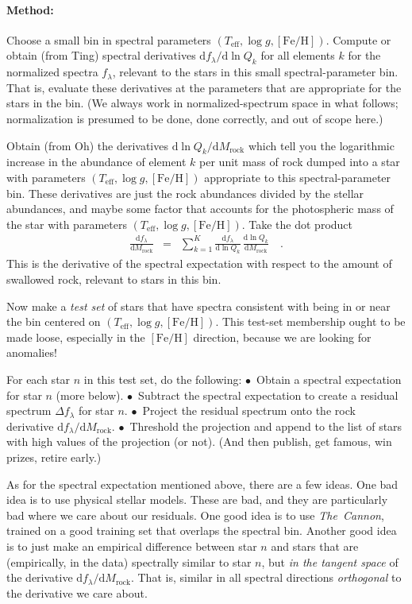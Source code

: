 \documentclass[12pt]{article}
\newcommand{\project}[1]{\textsl{#1}}
\newcommand{\TheCannon}{\project{The~Cannon}}
\newcommand{\dd}{\mathrm{d}}
\newcommand{\teff}{T_{\mathrm{eff}}}
\newcommand{\logg}{\log g}
\newcommand{\feh}{[\mathrm{Fe}/\mathrm{H}]}
\newcommand{\rock}{\mathrm{rock}}
\begin{document}
\paragraph{Method:}
Choose a small bin in spectral parameters $(\teff, \logg, \feh)$.
Compute or obtain (from Ting) spectral derivatives $\dd f_\lambda/\dd\ln Q_k$ for
all elements $k$ for the normalized spectra $f_\lambda$, relevant
to the stars in this small spectral-parameter bin.
That is, evaluate these derivatives at the parameters that are
appropriate for the stars in the bin.
(We always work in normalized-spectrum space in what follows; normalization
is presumed to be done, done correctly, and out of scope here.)

Obtain (from Oh) the derivatives $\dd\ln Q_k/\dd M_\rock$ which tell
you the logarithmic increase in the abundance of element $k$ per unit
mass of rock dumped into a star with parameters $(\teff, \logg, \feh)$
appropriate to this spectral-parameter bin.
These derivatives are just the rock abundances divided by the stellar
abundances, and maybe some factor that accounts for the photospheric
mass of the star with parameters $(\teff, \logg, \feh)$.
Take the dot product
\begin{eqnarray}
  \frac{\dd f_\lambda}{\dd M_\rock} &=&
  \sum_{k=1}^K \frac{\dd f_\lambda}{\dd\ln Q_k}\,\frac{\dd\ln Q_k}{\dd M_\rock}
  \quad .
\end{eqnarray}
This is the derivative of the spectral expectation with respect to
the amount of swallowed rock, relevant to stars in this bin.

Now make a \emph{test set} of
stars that have spectra consistent with being in or near
the bin centered on $(\teff, \logg, \feh)$.
This test-set membership ought to be made loose, especially in the $\feh$
direction, because we are looking for anomalies!

For each star $n$ in this test set, do the following:
$\bullet$~Obtain a spectral expectation for star $n$ (more below).
$\bullet$~Subtract the spectral expectation to create a residual spectrum
          $\Delta f_\lambda$ for star $n$.
$\bullet$~Project the residual spectrum onto the rock derivative
          $\dd f_\lambda / \dd M_\rock$.
$\bullet$~Threshold the projection and append to the list of stars with
          high values of the projection (or not).
(And then publish, get famous, win prizes, retire early.)

As for the spectral expectation mentioned above, there are a few ideas.
One bad idea is to use physical stellar models. These are bad, and they
are particularly bad where we care about our residuals. One good idea
is to use \TheCannon, trained on a good training set that overlaps the
spectral bin.
Another good idea is to just make an empirical difference between star
$n$ and stars that are (empirically, in the data) spectrally similar to
star $n$, but \emph{in the tangent space} of the derivative 
${\dd f_\lambda}/{\dd M_\rock}$.
That is, similar in all spectral directions \emph{orthogonal}
to the derivative we care about.
\end{document}
